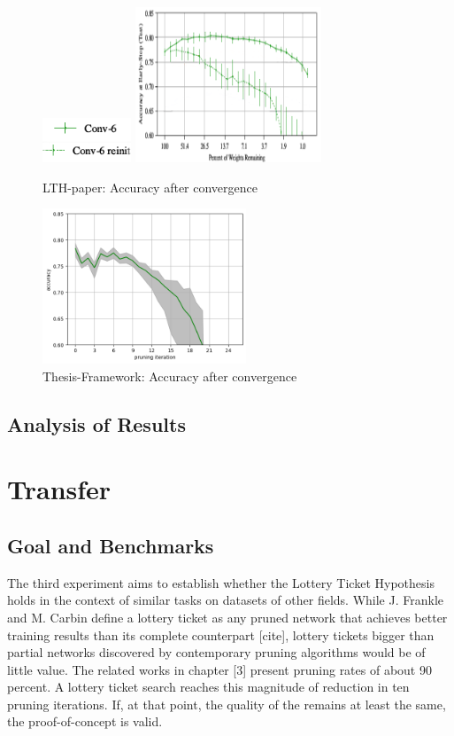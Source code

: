 \begin{figure}
	\begin{minipage}{\textwidth}
		\centering
		\includegraphics[width=100px]{gfx/7-Evaluation/LTH_4_legend.png}
	\end{minipage}
	\begin{minipage}{0.5\textwidth}
		\centering
		\includegraphics[height=175px]{gfx/7-Evaluation/LTH_CNN_clean.png}
		\caption*{LTH-paper: Accuracy after convergence}
		\label{?}
	\end{minipage}\hfill
	\begin{minipage}{0.5\textwidth}
		\centering
		\includegraphics[height=175px]{gfx/Experiments/Reproduction-CIFAR10-CNN/accuracy/LTH.png}
		\caption*{Thesis-Framework: Accuracy after convergence}
		\label{?}
	\end{minipage}
\end{figure}
\subsection*{Analysis of Results}

\section{Transfer}
\subsection*{Goal and Benchmarks}
The third experiment aims to establish whether the Lottery Ticket Hypothesis holds in the context of similar tasks on datasets of other fields. While J. Frankle and M. Carbin define a lottery ticket as any pruned network that achieves better training results than its complete counterpart [cite], lottery tickets bigger than partial networks discovered by contemporary pruning algorithms would be of little value. The related works in chapter [3] present pruning rates of about 90 percent. A lottery ticket search reaches this magnitude of reduction in ten pruning iterations. If, at that point, the quality of the remains at least the same, the proof-of-concept is valid.
